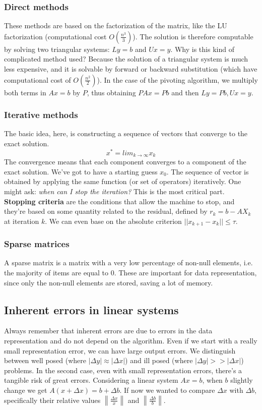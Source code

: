 \documentclass[11pt]{article}
\begin{document}
\subsubsection{Direct methods}
These methods are based on the factorization of the matrix, like the LU factorization (computational cost $O\left(\frac{n^3}{3}\right)$). The solution is therefore computable by solving two triangular systems: $Ly=b$ and $Ux = y$. Why is this kind of complicated method used? Because the solution of a triangular system is much less expensive, and it is solvable by forward or backward substitution (which have computational cost of $O\left(\frac{n^2}{2}\right)$). In the case of the pivoting algorithm, we multiply both terms in $Ax=b$ by $P$, thus obtaining $PAx = Pb$ and then $Ly = Pb,Ux=y$.
\subsubsection{Iterative methods}
The basic idea, here, is constructing a sequence of vectors that converge to the exact solution.
\begin{displaymath}
    x^* = lim_{k\rightarrow \infty} x_k
\end{displaymath}
The convergence means that each component converges to a component of the exact solution. 
We've got to have a starting guess $x_0$. The sequence of vector is obtained by applying the same function (or set of operators) iteratively. 
One might ask: \textit{when can I stop the iteration?} This is the most critical part. \textbf{Stopping criteria} are the conditions that allow the machine to stop, and they're based on some quantity related to the residual, defined by $r_k = b-AX_k$ at iteration $k$. We can even base on the absolute criterion $||x_{k+1}-x_k||\le \tau$.
\subsubsection{Sparse matrices}
A sparse matrix is a matrix with a very low percentage of non-null elements, i.e. the majority of items are equal to $0$. These are important for data representation, since only the non-null elements are stored, saving a lot of memory.
\subsection{Inherent errors in linear systems}
Always remember that inherent errors are due to errors in the data representation and do not depend on the algorithm.
Even if we start with a really small representation error, we can have large output errors. We distinguish between well posed (where $|\Delta y| \approx |\Delta x|$) and ill posed (where $|\Delta y| >> |\Delta x|$) problems. In the second case, even with small representation errors, there's a tangible risk of great errors. Considering a linear system $Ax=b$, when $b$ slightly change we get $A(x+\Delta x) = b + \Delta b$. If now we wanted to compare $\Delta x$ with $\Delta b$, specifically their relative values $\left\|\frac{\Delta x}{x}\right\|$ and $\left\|\frac{\Delta b}{b}\right\|$.
\end{document}
